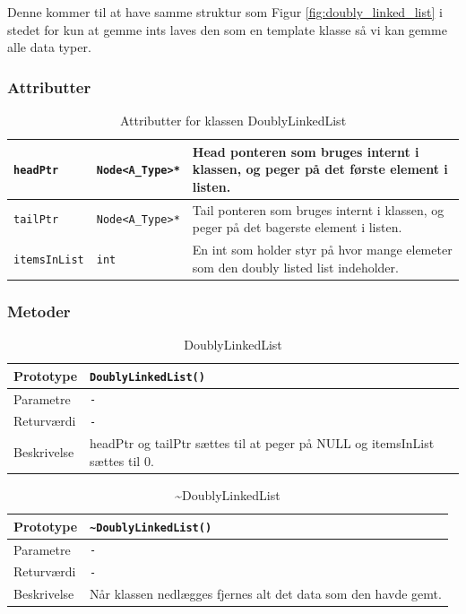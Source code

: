 Denne kommer til at have samme struktur som Figur \ref{fig:doubly_linked_list} i stedet for kun at gemme ints laves den som en template klasse så vi kan gemme alle data typer.

\subsubsection{Attributter}

\begin{table}[h]
\begin{tabularx}{\textwidth}{| Z | Z | L{10 cm} |} \hline
\texttt{headPtr} & \texttt{Node<A\_Type>*} & Head ponteren som bruges internt i klassen, og peger på det første element i listen. \\\hline
\texttt{tailPtr} & \texttt{Node<A\_Type>*} & Tail ponteren som bruges internt i klassen, og peger på det bagerste element i listen. \\\hline
\texttt{itemsInList} & \texttt{int} & En int som holder styr på hvor mange elemeter som den doubly listed list indeholder. \\\hline
\end{tabularx}
\caption{Attributter for klassen DoublyLinkedList}
\label{table:DoublyLinkedList_attributter}
\end{table}

\subsubsection{Metoder}

\begin{table}[h]
\begin{tabularx}{\textwidth}{| L{2.5 cm} | Z |} \hline
Prototype & \texttt{DoublyLinkedList()} \\\hline
Parametre & \texttt{-}\\\hline
Returværdi & \texttt{-}\\\hline
Beskrivelse & headPtr og tailPtr sættes til at peger på NULL og itemsInList sættes til 0. \\\hline
\end{tabularx}
\caption{DoublyLinkedList}
\label{table:DoublyLinkedList_contructor}
\end{table}


\begin{table}[h]
\begin{tabularx}{\textwidth}{| L{2.5 cm} | Z |} \hline
Prototype & \texttt{\textasciitilde DoublyLinkedList()} \\\hline
Parametre & \texttt{-}\\\hline
Returværdi & \texttt{-}\\\hline
Beskrivelse & Når klassen nedlægges fjernes alt det data som den havde gemt. \\\hline
\end{tabularx}
\caption{\textasciitilde DoublyLinkedList}
\label{table:DoublyLinkedList_destructor}
\end{table}


